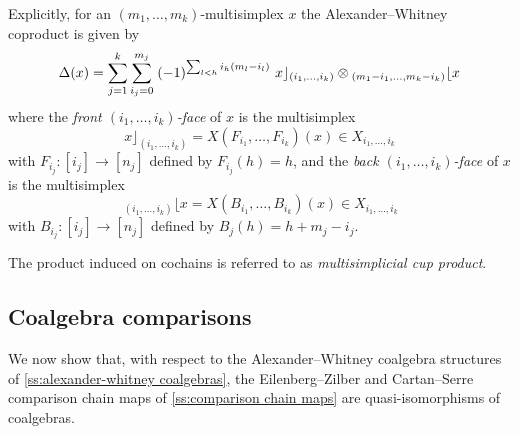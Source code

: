 Explicitly, for an $(m_1, \dots, m_k)$-multisimplex $x$ the Alexander--Whitney coproduct is given by
\[
\operatorname{\Delta}(x) =
\sum_{j=1}^k \sum_{i_{j}=0}^{m_{j}} \;  
(-1)^{\sum_{l<h} i_h (m_l-i_l) } \
x \rfloor_{(i_{1},\dots,i_{k})} \otimes 
\!\,_{(m_{1}-i_{1}, \dots, m_{k}-i_{k})} \lfloor x
\]
where the \textit{front $(i_1, \dots, i_k)$-face} of $x$ is the multisimplex
\[
x \rfloor_{(i_{1}, \dots, i_{k})} =
X(F_{i_1}, \dots, F_{i_k})(x) \in X_{i_1, \dots, i_k}
\]
with
$F_{i_j} \colon [i_j] \to [n_j]$ defined by $F_{i_j}(h)=h$, and the \textit{back $(i_1, \dots, i_k)$-face} of $x$ is the multisimplex
\[
\,_{(i_{1}, \dots, i_{k})} \lfloor x =
X(B_{i_1}, \dots, B_{i_k})(x) \in X_{i_1, \dots, i_k}
\]
with $B_{i_j} \colon [i_j] \to [n_j]$ defined by $B_j(h) = h+m_j-i_j$. 




The product induced on cochains is referred to as \textit{multisimplicial cup product}.

\subsection{Coalgebra comparisons}

We now show that, with respect to the Alexander--Whitney coalgebra structures of \cref{ss:alexander-whitney coalgebras}, the Eilenberg--Zilber and Cartan--Serre comparison chain maps of \cref{ss:comparison chain maps} are quasi-isomorphisms of coalgebras.

